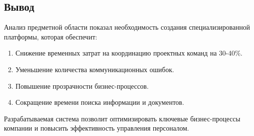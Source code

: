 \subsection{Вывод}

Анализ предметной области показал необходимость создания специализированной платформы, которая обеспечит:
\begin{enumerate}
  \item Снижение временных затрат на координацию проектных команд на 30-40\%.
  \item Уменьшение количества коммуникационных ошибок.
  \item Повышение прозрачности бизнес-процессов.
  \item Сокращение времени поиска информации и документов.
\end{enumerate}

Разрабатываемая система позволит оптимизировать ключевые бизнес-процессы компании и повысить эффективность управления персоналом.